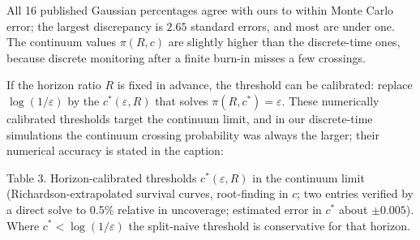 \documentclass[
  10pt,
  a4paper,
]{article}
\begin{document}
All 16 published Gaussian percentages agree with ours to within Monte
Carlo error; the largest discrepancy is \(2.65\) standard errors, and
most are under one. The continuum values \(\pi(R,c)\) are slightly
higher than the discrete-time ones, because discrete monitoring after a
finite burn-in misses a few crossings.

If the horizon ratio \(R\) is fixed in advance, the threshold can be
calibrated: replace \(\log(1/\varepsilon)\) by the
\(c^*(\varepsilon,R)\) that solves \(\pi(R,c^*)=\varepsilon\). These
numerically calibrated thresholds target the continuum limit, and in our
discrete-time simulations the continuum crossing probability was always
the larger; their numerical accuracy is stated in the caption:

Table 3. Horizon-calibrated thresholds \(c^*(\varepsilon,R)\) in the
continuum limit (Richardson-extrapolated survival curves, root-finding
in \(c\); two entries verified by a direct solve to 0.5\% relative in
uncoverage; estimated error in \(c^*\) about \(\pm0.005\)). Where
\(c^*<\log(1/\varepsilon)\) the split-naive threshold is conservative
for that horizon.
\end{document}
